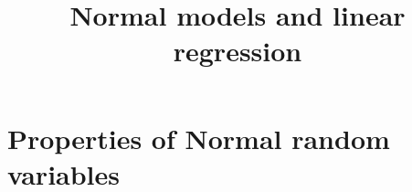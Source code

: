 


\title{Normal models and linear regression}

\maketitle
\tableofcontents



\newif\ifhideproofs

\ifhideproofs
\usepackage{environ}
\NewEnviron{hide}{}
\let\proof\hide
\let\endproof\endhide
\fi










\section{Properties of Normal random variables}
